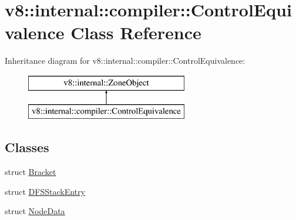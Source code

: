 \hypertarget{classv8_1_1internal_1_1compiler_1_1_control_equivalence}{}\section{v8\+:\+:internal\+:\+:compiler\+:\+:Control\+Equivalence Class Reference}
\label{classv8_1_1internal_1_1compiler_1_1_control_equivalence}
Inheritance diagram for v8\+:\+:internal\+:\+:compiler\+:\+:Control\+Equivalence\+:\begin{figure}[H]
\begin{center}
\leavevmode
\includegraphics[height=2.000000cm]{classv8_1_1internal_1_1compiler_1_1_control_equivalence}
\end{center}
\end{figure}
\subsection*{Classes}
\begin{DoxyCompactItemize}
\item 
struct \hyperlink{structv8_1_1internal_1_1compiler_1_1_control_equivalence_1_1_bracket}{Bracket}
\item 
struct \hyperlink{structv8_1_1internal_1_1compiler_1_1_control_equivalence_1_1_d_f_s_stack_entry}{D\+F\+S\+Stack\+Entry}
\item 
struct \hyperlink{structv8_1_1internal_1_1compiler_1_1_control_equivalence_1_1_node_data}{Node\+Data}
\end{DoxyCompactItemize}
